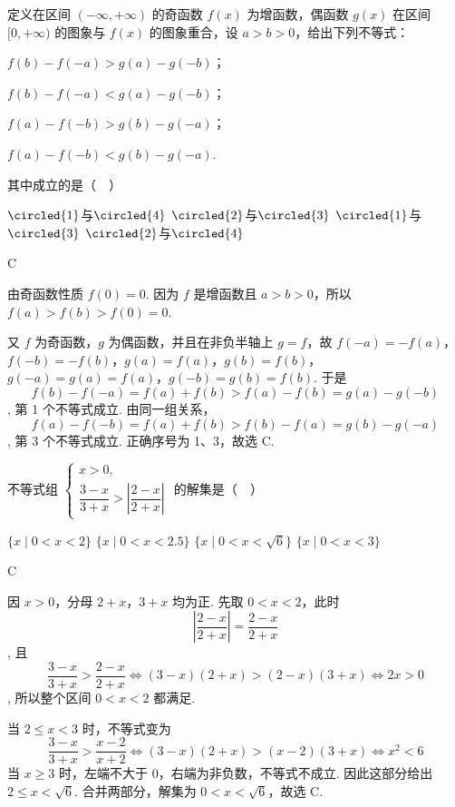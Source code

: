 \documentclass[UTF8,a4paper,oneside,11pt]{ctexbook}
\begin{document}
\begin{problem}
定义在区间 \((-\infty, +\infty)\) 的奇函数 \(f(x)\) 为增函数，偶函数 \(g(x)\) 在区间 \([0, +\infty)\) 的图象与 \(f(x)\) 的图象重合，设 \(a > b > 0\)，给出下列不等式：
\begin{circlelist}
\item \(f(b) - f(-a) > g(a) - g(-b)\)；
\item \(f(b) - f(-a) < g(a) - g(-b)\)；
\item \(f(a) - f(-b) > g(b) - g(-a)\)；
\item \(f(a) - f(-b) < g(b) - g(-a)\).
\end{circlelist}
其中成立的是（\(\quad\)）

\choices
    {\(\circled{1}\)与\(\circled{4}\)}
    {\(\circled{2}\)与\(\circled{3}\)}
    {\(\circled{1}\)与\(\circled{3}\)}
    {\(\circled{2}\)与\(\circled{4}\)}

\end{problem}

\begin{answer}
C
\end{answer}

\begin{solution}
由奇函数性质 \(f(0)=0\). 因为 \(f\) 是增函数且 \(a>b>0\)，所以 \(f(a)>f(b)>f(0)=0\).

又 \(f\) 为奇函数，\(g\) 为偶函数，并且在非负半轴上 \(g=f\)，故 \(f(-a)=-f(a)\)，\(f(-b)=-f(b)\)，\(g(a)=f(a)\)，\(g(b)=f(b)\)，\(g(-a)=g(a)=f(a)\)，\(g(-b)=g(b)=f(b)\).
于是
\[
f(b)-f(-a)=f(a)+f(b)>f(a)-f(b)=g(a)-g(-b)
\],
第 1 个不等式成立. 由同一组关系，
\[
f(a)-f(-b)=f(a)+f(b)>f(b)-f(a)=g(b)-g(-a)
\],
第 3 个不等式成立. 正确序号为 1、3，故选 C.
\end{solution}

\begin{problem}
不等式组 \(\begin{cases}
x > 0,\\
\dfrac{3-x}{3+x} > \left|\dfrac{2-x}{2+x}\right|
\end{cases}\) 的解集是（\(\quad\)）

\choices
    {\(\{x \mid 0 < x < 2\} \)}
    {\(\{x\mid 0 < x < 2.5\}\)}
    {\(\{x \mid 0 < x < \sqrt{6}\} \)}
    {\(\{x\mid 0 < x < 3\}\)}

\end{problem}

\begin{answer}
C
\end{answer}

\begin{solution}
因 \(x>0\)，分母 \(2+x\)，\(3+x\) 均为正. 先取 \(0<x<2\)，此时
\[
\left|\frac{2-x}{2+x}\right|=\frac{2-x}{2+x}
\],
且
\[
\frac{3-x}{3+x}>\frac{2-x}{2+x}
\iff (3-x)(2+x)>(2-x)(3+x)
\iff 2x>0
\],
所以整个区间 \(0<x<2\) 都满足.

当 \(2\leqslant x<3\) 时，不等式变为
\[
\frac{3-x}{3+x}>\frac{x-2}{x+2}
\iff (3-x)(2+x)>(x-2)(3+x)
\iff x^2<6
\]
当 \(x\geqslant3\) 时，左端不大于 \(0\)，右端为非负数，不等式不成立. 因此这部分给出 \(2\leqslant x<\sqrt6\). 合并两部分，解集为 \(0<x<\sqrt6\)，故选 C.
\end{solution}
\end{document}
